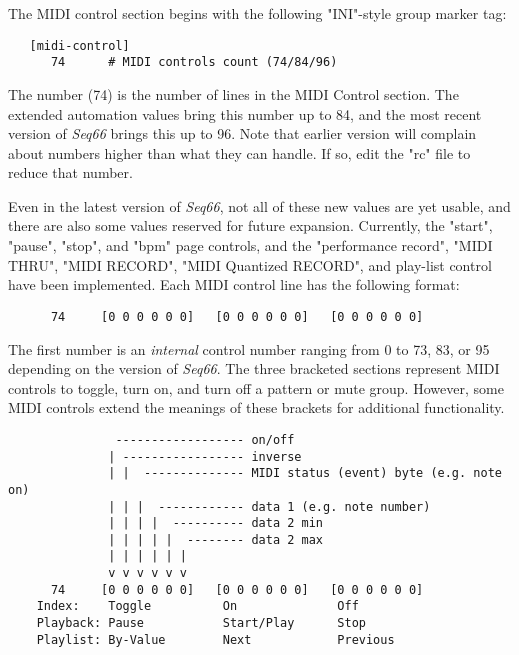    The MIDI control section begins with the following "INI"-style
   group marker tag:

   \begin{verbatim}
   [midi-control]
      74      # MIDI controls count (74/84/96)
   \end{verbatim}

   The number (74) is the number of lines in the MIDI Control section.  The
   extended automation values bring this number up to 84, and the most recent
   version of \textsl{Seq66} brings this up to 96.  Note that earlier
   version will complain about numbers higher than what they can handle.  If
   so, edit the "rc" file to reduce that number.

   Even in the latest version of \textsl{Seq66}, 
   not all of these new values are yet usable, and there are also some values
   reserved for future expansion.  Currently, the
   "start", "pause", "stop", and "bpm" page controls, and the "performance
   record", "MIDI THRU", "MIDI RECORD", "MIDI Quantized RECORD",
   and play-list control have been implemented.
   Each MIDI control line has the following format:

   \begin{verbatim}
      74     [0 0 0 0 0 0]   [0 0 0 0 0 0]   [0 0 0 0 0 0]
   \end{verbatim}

   The first number is an \textsl{internal} control number ranging from
   0 to 73, 83, or 95 depending on the version of \textsl{Seq66}.
   The three bracketed sections represent MIDI controls to
   toggle,
   turn on, and
   turn off a pattern or mute group.
   However, some MIDI controls extend the meanings of these brackets
   for additional functionality.

   \begin{verbatim}
               ------------------ on/off
              | ----------------- inverse
              | |  -------------- MIDI status (event) byte (e.g. note on)
              | | |  ------------ data 1 (e.g. note number)
              | | | |  ---------- data 2 min
              | | | | |  -------- data 2 max
              | | | | | |
              v v v v v v
      74     [0 0 0 0 0 0]   [0 0 0 0 0 0]   [0 0 0 0 0 0]
    Index:    Toggle          On              Off
    Playback: Pause           Start/Play      Stop
    Playlist: By-Value        Next            Previous
   \end{verbatim}

